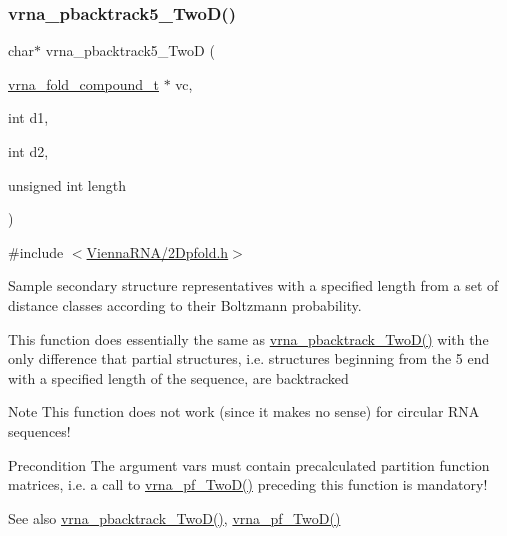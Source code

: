 \subsubsection{\texorpdfstring{vrna\+\_\+pbacktrack5\+\_\+\+Two\+D()}{vrna\_pbacktrack5\_TwoD()}}
{\footnotesize\ttfamily char$\ast$ vrna\+\_\+pbacktrack5\+\_\+\+TwoD (\begin{DoxyParamCaption}\item[{\hyperlink{group__fold__compound_ga1b0cef17fd40466cef5968eaeeff6166}{vrna\+\_\+fold\+\_\+compound\+\_\+t} $\ast$}]{vc,  }\item[{int}]{d1,  }\item[{int}]{d2,  }\item[{unsigned int}]{length }\end{DoxyParamCaption})}



{\ttfamily \#include $<$\hyperlink{2Dpfold_8h}{Vienna\+R\+N\+A/2\+Dpfold.\+h}$>$}



Sample secondary structure representatives with a specified length from a set of distance classes according to their Boltzmann probability. 

This function does essentially the same as \hyperlink{group__kl__neighborhood__stochbt_ga14aceef73f83bbde77bb3a0ca06c9d13}{vrna\+\_\+pbacktrack\+\_\+\+Two\+D()} with the only difference that partial structures, i.\+e. structures beginning from the 5\textquotesingle{} end with a specified length of the sequence, are backtracked

\begin{DoxyNote}{Note}
This function does not work (since it makes no sense) for circular R\+NA sequences! 
\end{DoxyNote}
\begin{DoxyPrecond}{Precondition}
The argument \textquotesingle{}vars\textquotesingle{} must contain precalculated partition function matrices, i.\+e. a call to \hyperlink{group__kl__neighborhood__pf_ga0bc3427689bd09da09b8b3094a27f836}{vrna\+\_\+pf\+\_\+\+Two\+D()} preceding this function is mandatory!
\end{DoxyPrecond}
\begin{DoxySeeAlso}{See also}
\hyperlink{group__kl__neighborhood__stochbt_ga14aceef73f83bbde77bb3a0ca06c9d13}{vrna\+\_\+pbacktrack\+\_\+\+Two\+D()}, \hyperlink{group__kl__neighborhood__pf_ga0bc3427689bd09da09b8b3094a27f836}{vrna\+\_\+pf\+\_\+\+Two\+D()}
\end{DoxySeeAlso}

